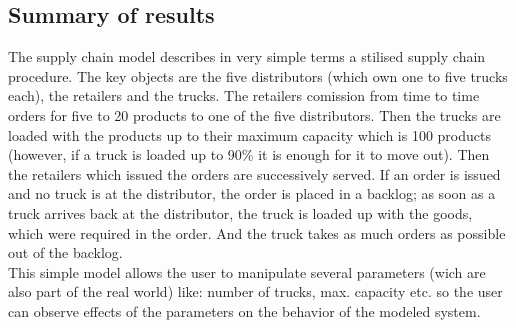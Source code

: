  \subsection{Summary of results}
The supply chain model describes in very simple terms a stilised supply chain procedure.
The key objects are the five distributors (which own one to five trucks each), the retailers and the trucks. 
The retailers comission from time to time orders for five to 20 products to one of the five distributors.
Then the trucks are loaded with the products up to their maximum capacity which is 100 products 
(however, if a truck is loaded up to 90\% it is enough for it to move out). Then the retailers which
issued the orders are successively served. If an order is issued and no truck is at the distributor,
the order is placed in a backlog; as soon as a truck arrives back at the distributor, the truck is loaded up with the goods,
which were required in the order. And the truck takes as much orders as possible out of the backlog.
\\
This simple model allows the user to manipulate several parameters (wich are
also part of the real world) like: number of trucks, max.
capacity etc. so the user can observe effects of the parameters on the behavior of the modeled system.


 
